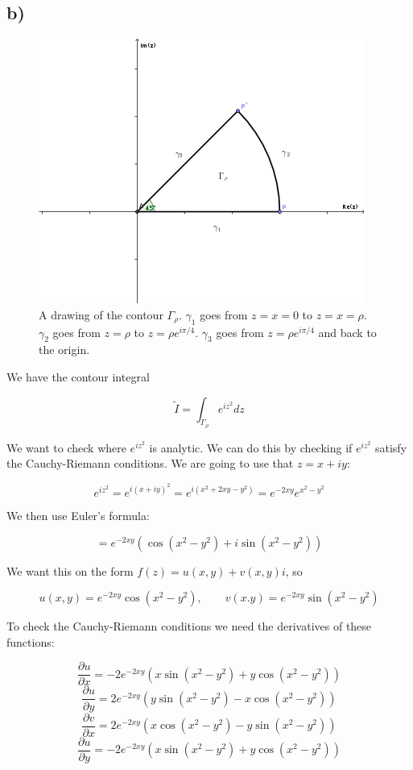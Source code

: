 \documentclass[a4paper,norsk, 10pt]{article}
\begin{document}
\subsection*{b)}
\begin{figure}[H]
\centering
\includegraphics[scale=0.8]{2b.png}
\caption{A drawing of the contour $\Gamma_{\rho}$. $\gamma_1$ goes from $z = x=0$ to $z = x = \rho$. $\gamma_2$ goes from $z = \rho$ to $z = \rho e^{i\pi/4}$. $\gamma_3$ goes from $z = \rho e^{i\pi/4}$ and back to the origin.}
\end{figure}

We have the contour integral

$$
\tilde{I} = \int_{\Gamma_{\rho}} e^{iz^2}dz
$$

We want to check where $e^{iz^2}$ is analytic. We can do this by checking if $e^{iz^2}$ satisfy the Cauchy-Riemann conditions. We are going to use that $z = x+iy$:

$$
e^{iz^2} = e^{i(x + iy)^2} = e^{i(x^2 + 2xy -y^2)} = e^{-2xy}e^{x^2-y^2}
$$

We then use Euler's formula:

$$
= e^{-2xy}(\cos(x^2-y^2) + i\sin(x^2-y^2))
$$

We want this on the form $f(z) = u(x,y) + v(x,y)i$, so

$$
u(x,y) = e^{-2xy}\cos(x^2-y^2), \qquad v(x.y) = e^{-2xy}\sin(x^2-y^2)
$$

To check the Cauchy-Riemann conditions we need the derivatives of these functions:

$$
\frac{\partial u}{\partial x} = -2e^{-2xy}(x\sin(x^2-y^2) + y\cos(x^2 - y^2))
$$
$$
\frac{\partial u}{\partial y} = 2e^{-2xy}(y\sin(x^2-y^2) - x\cos(x^2 - y^2))
$$
$$
\frac{\partial v}{\partial x} = 2e^{-2xy}(x\cos(x^2-y^2) - y\sin(x^2 - y^2))
$$
$$
\frac{\partial u}{\partial y} = -2e^{-2xy}(x\sin(x^2-y^2) + y\cos(x^2 - y^2))
$$
\end{document}
